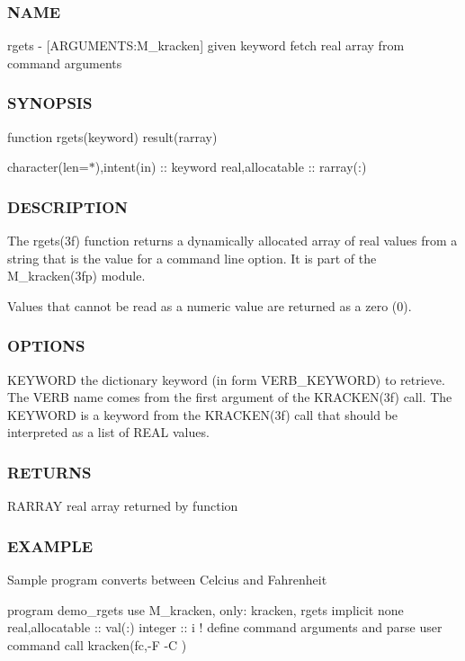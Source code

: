 \subsubsection*{N\+A\+ME}

rgets -\/ \mbox{[}A\+R\+G\+U\+M\+E\+N\+TS\+:M\+\_\+kracken\mbox{]} given keyword fetch real array from command arguments \subsubsection*{S\+Y\+N\+O\+P\+S\+IS}

function rgets(keyword) result(rarray)

character(len=$\ast$),intent(in) \+:\+: keyword real,allocatable \+:\+: rarray(\+:) \subsubsection*{D\+E\+S\+C\+R\+I\+P\+T\+I\+ON}

The rgets(3f) function returns a dynamically allocated array of real values from a string that is the value for a command line option. It is part of the M\+\_\+kracken(3fp) module.

Values that cannot be read as a numeric value are returned as a zero (0).

\subsubsection*{O\+P\+T\+I\+O\+NS}

K\+E\+Y\+W\+O\+RD the dictionary keyword (in form V\+E\+R\+B\+\_\+\+K\+E\+Y\+W\+O\+RD) to retrieve. The V\+E\+RB name comes from the first argument of the K\+R\+A\+C\+K\+E\+N(3f) call. The K\+E\+Y\+W\+O\+RD is a keyword from the K\+R\+A\+C\+K\+E\+N(3f) call that should be interpreted as a list of R\+E\+AL values.

\subsubsection*{R\+E\+T\+U\+R\+NS}

R\+A\+R\+R\+AY real array returned by function

\subsubsection*{E\+X\+A\+M\+P\+LE}

Sample program converts between Celcius and Fahrenheit

program demo\+\_\+rgets use M\+\_\+kracken, only\+: kracken, rgets implicit none real,allocatable \+:\+: val(\+:) integer \+:\+: i ! define command arguments and parse user command call kracken(\textquotesingle{}fc\textquotesingle{},\textquotesingle{}-\/F -\/C\textquotesingle{} )

